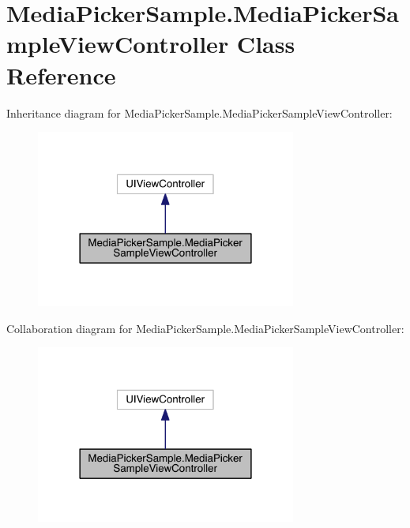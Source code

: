\hypertarget{class_media_picker_sample_1_1_media_picker_sample_view_controller}{\section{Media\+Picker\+Sample.\+Media\+Picker\+Sample\+View\+Controller Class Reference}
\label{class_media_picker_sample_1_1_media_picker_sample_view_controller}
}


Inheritance diagram for Media\+Picker\+Sample.\+Media\+Picker\+Sample\+View\+Controller\+:
\nopagebreak
\begin{figure}[H]
\begin{center}
\leavevmode
\includegraphics[width=242pt]{class_media_picker_sample_1_1_media_picker_sample_view_controller__inherit__graph}
\end{center}
\end{figure}


Collaboration diagram for Media\+Picker\+Sample.\+Media\+Picker\+Sample\+View\+Controller\+:
\nopagebreak
\begin{figure}[H]
\begin{center}
\leavevmode
\includegraphics[width=242pt]{class_media_picker_sample_1_1_media_picker_sample_view_controller__coll__graph}
\end{center}
\end{figure}
